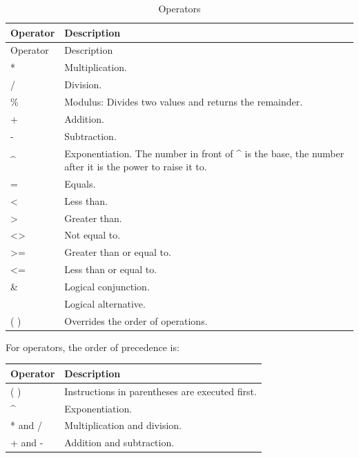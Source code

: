 \documentclass[
]{book}
\theoremstyle{definition}
\theoremstyle{definition}
\theoremstyle{definition}
\theoremstyle{definition}
\theoremstyle{remark}
\begin{document}
\begin{minipage}{\textwidth}

\begin{longtable}[]{@{}
  >{\raggedright\arraybackslash}p{}
  >{\raggedright\arraybackslash}p{}@{}}
\caption{Operators}\tabularnewline
\toprule
Operator & Description \\
\midrule
\endfirsthead
\toprule
Operator & Description \\
\midrule
\endhead
* & Multiplication. \\
/ & Division. \\
\% & Modulus: Divides two values and returns the remainder. \\
+ & Addition. \\
- & Subtraction. \\
\^{} & Exponentiation. The number in front of \^{} is the base, the number after it is the power to raise it to. \\
= & Equals. \\
\textless{} & Less than. \\
\textgreater{} & Greater than. \\
\textless\textgreater{} & Not equal to. \\
\textgreater= & Greater than or equal to. \\
\textless= & Less than or equal to. \\
\& & Logical conjunction. \\
\textbar{} & Logical alternative. \\
( ) & Overrides the order of operations. \\
\bottomrule
\end{longtable}

\end{minipage}

\begin{minipage}{\textwidth}

For operators, the order of precedence is:

\begin{longtable}[]{@{}ll@{}}
\toprule
Operator & Description \\
\midrule
\endhead
( ) & Instructions in parentheses are executed first. \\
\^{} & Exponentiation. \\
* and / & Multiplication and division. \\
+ and - & Addition and subtraction. \\
\bottomrule
\end{longtable}

\end{minipage}
\end{document}
